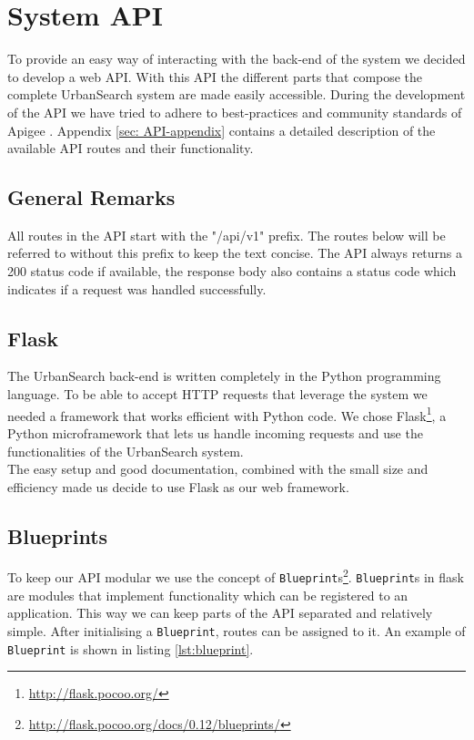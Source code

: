 \section{System API}\label{sec: 5-API}
To provide an easy way of interacting with the back-end of the system we decided to develop a web API. With this API the different parts that compose the complete UrbanSearch system are made easily accessible. During the development of the API we have tried to adhere to best-practices and community standards of Apigee \cite{apigee}. Appendix \ref{sec: API-appendix} contains a detailed description of the available API routes and their functionality.

\subsection{General Remarks}

All routes in the API start with the "/api/v1" prefix. The routes below will be referred to without this prefix to keep the text concise. The API always returns a 200 status code if available, the response body also contains a status code which indicates if a request was handled successfully.

\subsection{Flask}
The UrbanSearch back-end is written completely in the Python programming language. To be able to accept HTTP requests that leverage the system we needed a framework that works efficient with Python code. We chose Flask\footnote{\url{http://flask.pocoo.org/}}, a Python microframework that lets us handle incoming requests and use the functionalities of the UrbanSearch system.\\
The easy setup and good documentation, combined with the small size and efficiency made us decide to use Flask as our web framework.

\subsection{Blueprints}
To keep our API modular we use the concept of \texttt{Blueprint}s\footnote{\url{http://flask.pocoo.org/docs/0.12/blueprints/}}. \texttt{Blueprint}s in flask are modules that implement functionality which can be registered to an application. This way we can keep parts of the API separated and relatively simple. After initialising a \texttt{Blueprint}, routes can be assigned to it. An example of \texttt{Blueprint} is shown in listing \ref{lst:blueprint}.\\

